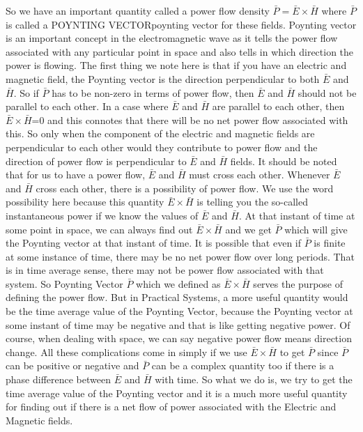 So we have an important quantity called a power flow density $ \bar{P}=\bar{E}\times\bar{H} $ where $  \bar{P}  $ is called a POYNTING VECTORpoynting vector for these fields. Poynting vector is an important concept in the electromagnetic wave as it tells the power flow associated with any particular point in space and also tells in which direction the power is flowing. The first thing we note here is that if you have an electric and magnetic field, the Poynting vector is the direction perpendicular to both $ \bar{E} $ and  $ \bar{H} $. So if $  \bar{P}  $  has to be non-zero in terms of power flow, then $ \bar{E} $ and  $ \bar{H} $ should not be parallel to each other. In a case where  $ \bar{E} $ and  $ \bar{H} $ are parallel to each other, then  $ \bar{E}\times\bar{H} $=0 and this connotes that there will be no net power flow associated with this. So only when the component of the electric and magnetic fields are perpendicular to each other would they contribute to power flow and the direction of power flow is perpendicular to $ \bar{E} $ and  $ \bar{H} $    fields. It should be noted that for us to have a power flow, $ \bar{E} $ and  $ \bar{H} $  must cross each other. Whenever $ \bar{E} $ and  $ \bar{H} $ cross each other, there is a possibility of power flow. We use the word possibility here because this quantity   $ \bar{E}\times\bar{H} $ is telling you the so-called instantaneous power if we know the values of  $ \bar{E} $ and  $ \bar{H} $. At that instant of time at some point in space, we can always find out $ \bar{E}\times\bar{H} $ and we get $  \bar{P}  $ which will give the Poynting vector at that instant of time. It is possible that even if $  \bar{P}  $ is finite at some instance of time, there may be no net power flow over long periods. That is in time average sense, there may not be power flow associated with that system. So Poynting Vector $  \bar{P}  $ which we defined as $ \bar{E}\times\bar{H} $  serves the purpose of defining the power flow. But in Practical Systems, a more useful quantity would be the time average value of the Poynting Vector, because the Poynting vector at some instant of time may be negative and that is like getting negative power. Of course, when dealing with space, we can say negative power flow means direction change. All these complications come in simply if we use $ \bar{E}\times\bar{H} $ to get  $  \bar{P}  $ since $  \bar{P}  $  can be positive or negative and $  \bar{P}  $  can be a complex quantity too if there is a phase difference between $ \bar{E} $ and  $ \bar{H} $ with time. So what we do is, we try to get the time average value of the Poynting vector and it is a much more useful quantity for finding out if there is a net flow of power associated with the Electric and Magnetic fields. 


